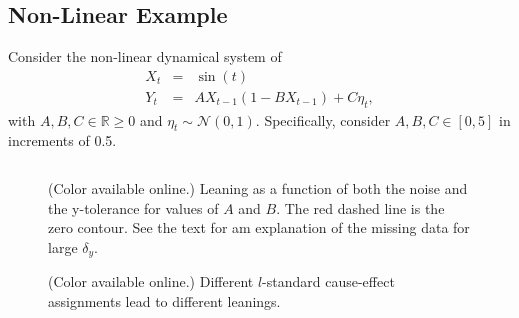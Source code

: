 \documentclass[a4paper,11pt,twocolumn]{article}
\begin{document}
\subsection{Non-Linear Example}
\label{sec:nonli}
Consider the non-linear dynamical system of
\begin{eqnarray}
\label{eqn:nonlinearEX}
X_t &=& \sin(t)\\
Y_t &=& AX_{t-1}\left(1-BX_{t-1}\right)+C\eta_t,
\end{eqnarray}
with $A,B,C\in\mathbb{R}\ge 0$ and $\eta_t\sim\mathcal{N}\left(0,1\right)$.  Specifically, consider $A,B,C\in[0,5]$ in increments of 0.5.
\begin{figure}[ht]
\begin{tabular}{cc}
\end{tabular}
\caption{(Color available online.) Leaning as a function of both the noise and the y-tolerance for values of $A$ and $B$.  The red dashed line is the zero contour.  See the text for am explanation of the missing data for large $\delta_y$.}
\end{figure}
\begin{figure}[ht]
\caption{(Color available online.) Different $l$-standard cause-effect assignments lead to different leanings.}
\end{figure}  

  
\end{document}
